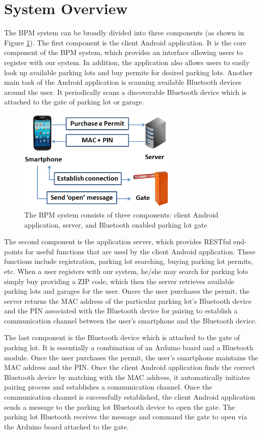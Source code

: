 \section{System Overview}

The BPM system can be broadly divided into three components (as shown in Figure \ref{fig:sys_overview}). The first component is the client Android application. It is the core component of the BPM system, which provides an interface allowing users to register with our system. In addition, the application also allows users to easily look up available parking lots and buy permits for desired parking lots. Another main task of the Android application is scanning available Bluetooth devices around the user. It periodically scans a discoverable Bluetooth device which is attached to the gate of parking lot or garage. 

\begin{figure}[ht]
	\centering
		\includegraphics[width=3in]{figure/sys_overview.png}
		\caption{The BPM system consists of three components: client Android application, server, and Bluetooth enabled parking lot gate}
	\label{fig:sys_overview}
\end{figure}

The second component is the application server, which provides RESTful end-points for useful functions that are used by the client Android application. These functions include registration, parking lot searching, buying parking lot permits, etc. When a user registers with our system, he/she may search for parking lots simply buy providing a ZIP code, which then the server retrieves available parking lots and garages for the user. Oncec the user purchases the permit, the server returns the MAC address of the particular parking lot's Bluetooth device and the PIN associated with the Bluetooth device for pairing to establish a communication channel between the user's smartphone and the Bluetooth device.

The last component is the Bluetooth device which is attached to the gate of parking lot. It is essentially a combination of an Arduino board and a Bluetooth module. Once the user purchases the permit, the user's smartphone maintains the MAC address and the PIN. Once the client Android application finds the correct Bluetooth device by matching with the MAC address, it automatically initiates pairing process and establishes a communication channel. Once the communication channel is successfully established, the client Android application sends a message to the parking lot Bluetooth device to open the gate. The parking lot Bluetooth receives the message and command the gate to open via the Arduino board attached to the gate.